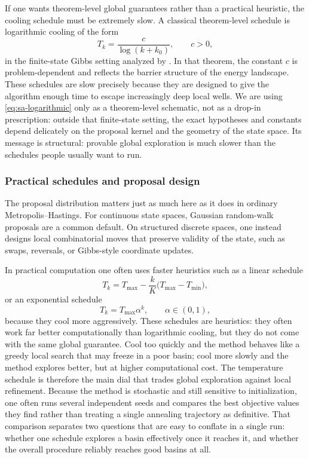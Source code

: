 If one wants theorem-level global guarantees rather than a practical heuristic, the cooling schedule must be extremely slow.
A classical theorem-level schedule is logarithmic cooling of the form
\begin{equation}
  T_k = \frac{c}{\log(k+k_0)},
  \qquad c>0,
  \label{eq:sa-logarithmic}
\end{equation}
in the finite-state Gibbs setting analyzed by \citet[eq.~(12.7), Thm.~C, and p.~732]{geman_geman_1984_stochastic_relaxation}.
In that theorem, the constant $c$ is problem-dependent and reflects the barrier structure of the energy landscape.
These schedules are slow precisely because they are designed to give the algorithm enough time to escape increasingly deep local wells.
We are using \eqref{eq:sa-logarithmic} only as a theorem-level schematic, not as a drop-in prescription: outside that finite-state setting, the exact hypotheses and constants depend delicately on the proposal kernel and the geometry of the state space.
Its message is structural: provable global exploration is much slower than the schedules people usually want to run.

\subsubsection{Practical schedules and proposal design}
\label{subsubsec:sa-practical}

The proposal distribution matters just as much here as it does in ordinary Metropolis--Hastings.
For continuous state spaces, Gaussian random-walk proposals are a common default.
On structured discrete spaces, one instead designs local combinatorial moves that preserve validity of the state, such as swaps, reversals, or Gibbs-style coordinate updates.

In practical computation one often uses faster heuristics such as a linear schedule
\begin{equation}
  T_k = T_{\max} - \frac{k}{K}\bigl(T_{\max}-T_{\min}\bigr),
  \label{eq:sa-linear}
\end{equation}
or an exponential schedule
\begin{equation}
  T_k = T_{\max}\alpha^k,
  \qquad \alpha \in (0,1),
  \label{eq:sa-exponential}
\end{equation}
because they cool more aggressively.
These schedules are heuristics: they often work far better computationally than logarithmic cooling, but they do not come with the same global guarantee.
Cool too quickly and the method behaves like a greedy local search that may freeze in a poor basin; cool more slowly and the method explores better, but at higher computational cost.
The temperature schedule is therefore the main dial that trades global exploration against local refinement.
Because the method is stochastic and still sensitive to initialization, one often runs several independent seeds and compares the best objective values they find rather than treating a single annealing trajectory as definitive.
That comparison separates two questions that are easy to conflate in a single run: whether one schedule explores a basin effectively once it reaches it, and whether the overall procedure reliably reaches good basins at all.

